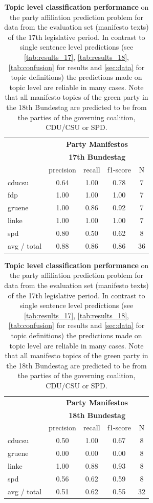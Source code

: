 \documentclass{article}
\begin{document}
\begin{table}[t]
\caption{
\label{tab:results_topic}
{\bf Topic level classification performance} on the party affiliation prediction problem for data from the evaluation set (manifesto texts) of the 17th legislative period. In contrast to single sentence level predictions (see \autoref{tab:results_17}, \autoref{tab:results_18}, \autoref{tab:confusion} for results and \autoref{sec:data} for topic definitions) the predictions made on topic level are reliable in many cases. Note that all manifesto topics of the green party in the 18th Bundestag are predicted to be from the parties of the governing coalition, CDU/CSU or SPD.}
\begin{center}
\begin{tabular}{lcccc}
& \multicolumn{4}{c}{\bf Party Manifestos} \\
& \multicolumn{4}{c}{\bf 17th Bundestag} \\
    &         precision    &recall &  f1-score  & N  \\
    \hline
        \hline
cducsu     &  0.64  &    1.00  &    0.78    &     7\\
       fdp    &   1.00    &  1.00    &  1.00    &     7\\
    gruene  &     1.00  &    0.86  &    0.92    &     7\\
     linke    &   1.00   &   1.00     & 1.00    &     7\\
       spd   &    0.80   &   0.50    &  0.62     &    8\\
    \hline
    avg / total  &     0.88   &   0.86   &   0.86  &      36\\
\end{tabular}
\quad
\begin{tabular}{lcccc}
& \multicolumn{4}{c}{\bf Party Manifestos} \\
& \multicolumn{4}{c}{\bf 18th Bundestag} \\
    &         precision    &recall &  f1-score  & N  \\
    \hline
    \hline
  cducsu     &  0.50   &   1.00  &    0.67     &    8\\
       gruene  &     0.00   &   0.00   &   0.00  &       8\\
      linke     &  1.00   &   0.88   &   0.93  &       8\\
        spd     &  0.56  &    0.62  &    0.59   &      8\\
\hline
avg / total   &    0.51 &     0.62   &   0.55   &     32\\
\end{tabular}
\end{center}

\end{table}
\end{document}

